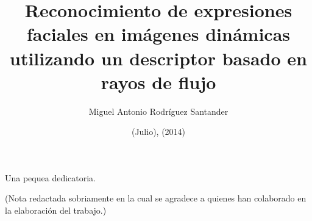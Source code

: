 \documentclass[thesis,final]{udpbook}
\begin{document}
\frontmatter
%
%
\begin{titlepage}
\title{Reconocimiento de expresiones faciales en imágenes dinámicas utilizando un descriptor basado en rayos de flujo}
\author{Miguel Antonio Rodríguez Santander}
\date{(Julio), (2014)}	%
\end{titlepage}                      %
%
%
\begin{signaturepage}                   %
%
\end{signaturepage}                     %
%
%
\begin{dedicatory}                      %
Una pequea dedicatoria.                %
\end{dedicatory}                        %
%
%
\tableofcontents                        %
\listoffigures                          %
\listoftables                           %
%
%
\begin{acknowledgment}                  %
(Nota redactada sobriamente en la cual se agradece a quienes han colaborado en la elaboración del trabajo.)
\end{acknowledgment}                    %
\end{document}
